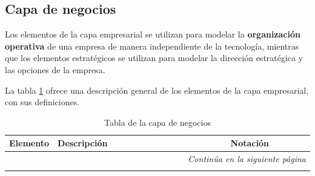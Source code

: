 
\subsection{Capa de negocios}
Los elementos de la capa empresarial se utilizan para modelar la \textbf{organización operativa} de una empresa de manera independiente de la tecnología, mientras que los elementos estratégicos se utilizan para modelar la dirección estratégica y las opciones de la empresa.

La tabla \ref{tab:Tabla de la capa de negocios} ofrece una descripción general de los elementos de la capa empresarial, con sus definiciones.\cite{archimate} 

\begin{longtable}{|p{0.15\linewidth}|p{0.45\linewidth}|p{0.2\linewidth} p{0.2\linewidth}|}
    \caption{Tabla de la capa de negocios}
    \\
    \hline
    \rowcolor[HTML]{AFC5F6} 
    \textbf{Elemento} & \textbf{Descripción} & \multicolumn{2}{c|}{\textbf{Notación}} \\
    \hline
    \endhead
    \hline
    \multicolumn{4}{r}{\textit{Continúa en la siguiente página}} \\
    \endfoot
    \hline
    \endlastfoot
    \label{tab:Tabla de la capa de negocios}




\end{longtable}
